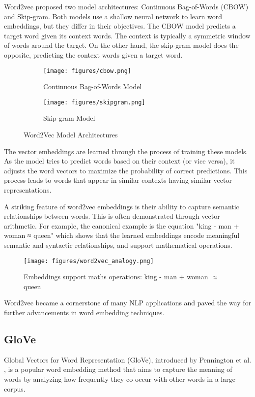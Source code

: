 \documentclass[a4paper, oneside]{discothesis}
\begin{document}
Word2vec proposed two model architectures: Continuous Bag-of-Words (CBOW) and Skip-gram. Both models use a shallow neural network to learn word embeddings, but they differ in their objectives. 
The CBOW model predicts a target word given its context words. The context is typically a symmetric window of words around the target.
On the other hand, the skip-gram model does the opposite, predicting the context words given a target word.
\begin{figure}[h]
    \centering
    \begin{subfigure}[b]{0.45\textwidth}
        \centering
        \texttt{[image: figures/cbow.png]}
        \caption{Continuous Bag-of-Words Model}
        \label{fig:cbow}
    \end{subfigure}
    \hfill
    \begin{subfigure}[b]{0.45\textwidth}
        \centering
        \texttt{[image: figures/skipgram.png]}
        \caption{Skip-gram Model}
        \label{fig:skipgram}
    \end{subfigure}
    \caption{Word2Vec Model Architectures}
    \label{fig:word2vec}
\end{figure}

The vector embeddings are learned through the process of training these models. As the model tries to predict words based on their context (or vice versa), it adjusts the word vectors to maximize the probability of correct predictions. This process leads to words that appear in similar contexts having similar vector representations.

A striking feature of word2vec embeddings is their ability to capture semantic relationships between words. This is often demonstrated through vector arithmetic. For example, the canonical example is the equation "king - man + woman ≈ queen" which shows that the learned embeddings encode meaningful semantic and syntactic relationships, and support mathematical operations.

\begin{figure}[h]
    \centering
    \texttt{[image: figures/word2vec\_analogy.png]}
    \caption{Embeddings support maths operations: king - man + woman $\approx$ queen}
    \label{fig:word2vec_analogy}
\end{figure}

Word2vec became a cornerstone of many NLP applications and paved the way for further advancements in word embedding techniques.

\subsection{GloVe}
Global Vectors for Word Representation (GloVe), introduced by Pennington et al. \cite{pennington2014glove}, is a popular word embedding method that aims to capture the meaning of words by analyzing how frequently they co-occur with other words in a large corpus.
\end{document}
